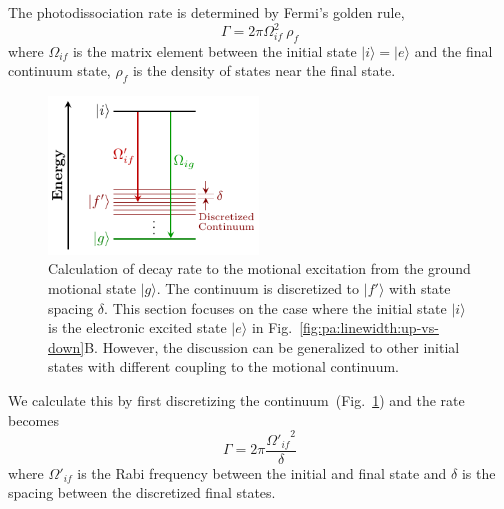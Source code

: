 The photodissociation rate is determined by Fermi's golden rule,
\[
  \Gamma=2\pi\Omega_{if}^2\ \rho_f
\]
where $\Omega_{if}$ is the matrix element
between the initial state $|i\rangle=|e\rangle$
and the final continuum state,
$\rho_f$ is the density of states near the final state.
\begin{figure}
  \centering
  \includegraphics[width=0.497\textwidth]{figures/pa_two_photon_down_discretized.pdf}
  \caption[Calculation of decay rate using discretized continuum state]{
    Calculation of decay rate to the motional excitation
    from the ground motional state $|g\rangle$.
    The continuum is discretized to $|f'\rangle$ with state spacing $\delta$.
    This section focuses on the case where the initial state $|i\rangle$
    is the electronic excited state $|e\rangle$ in Fig.~\ref{fig:pa:linewidth:up-vs-down}B.
    However, the discussion can be generalized to other initial states
    with different coupling to the motional continuum.
    \label{fig:pa:linewidth:discretized}}
\end{figure}
We calculate this by first discretizing the continuum~(Fig.~\ref{fig:pa:linewidth:discretized})
and the rate becomes
\[
  \Gamma=2\pi\frac{{\Omega'_{if}}^2}{\delta}
\]
where $\Omega'_{if}$ is the Rabi frequency between the initial and final state
and $\delta$ is the spacing between the discretized final states.

